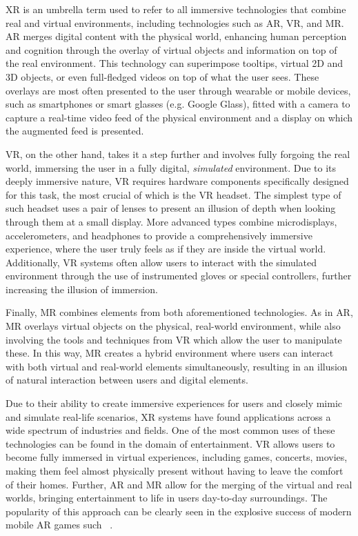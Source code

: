 \gls{XR} is an umbrella term used to refer to all immersive technologies that combine real and virtual environments, including technologies such as \gls{AR}, \gls{VR}, and \gls{MR}.
\gls{AR} merges digital content with the physical world, enhancing human perception and cognition through the overlay of virtual objects and information on top of the real environment.
This technology can superimpose tooltips, virtual \gls{2D} and \gls{3D} objects, or even full-fledged videos on top of what the user sees.
These overlays are most often presented to the user through wearable or mobile devices, such as smartphones or smart glasses (e.g. Google Glass), fitted with a camera to capture a real-time video feed of the physical environment and a display on which the augmented feed is presented.

\gls{VR}, on the other hand, takes it a step further and involves fully forgoing the real world, immersing the user in a fully digital, \emph{simulated} environment.
Due to its deeply immersive nature, \gls{VR} requires hardware components specifically designed for this task, the most crucial of which is the \gls{VR} headset.
The simplest type of such headset uses a pair of lenses to present an illusion of depth when looking through them at a small display.
More advanced types combine microdisplays, accelerometers, and headphones to provide a comprehensively immersive experience, where the user truly feels as if they are inside the virtual world.
Additionally, \gls{VR} systems often allow users to interact with the simulated environment through the use of instrumented gloves or special controllers, further increasing the illusion of immersion.

Finally, \gls{MR} combines elements from both aforementioned technologies.
As in \gls{AR}, \gls{MR} overlays virtual objects on the physical, real-world environment, while also involving the tools and techniques from \gls{VR} which allow the user to manipulate these.
In this way, \gls{MR} creates a hybrid environment where users can interact with both virtual and real-world elements simultaneously, resulting in an illusion of natural interaction between users and digital elements.

\medskip

Due to their ability to create immersive experiences for users and closely mimic and simulate real-life scenarios, \gls{XR} systems have found applications across a wide spectrum of industries and fields.
One of the most common uses of these technologies can be found in the domain of entertainment.
\gls{VR} allows users to become fully immersed in virtual experiences, including games, concerts, movies, making them feel almost physically present without having to leave the comfort of their homes.
Further, \gls{AR} and \gls{MR} allow for the merging of the virtual and real worlds, bringing entertainment to life in users day-to-day surroundings.
The popularity of this approach can be clearly seen in the explosive success of modern mobile \gls{AR} games such ~\cite{pokemongo}.

